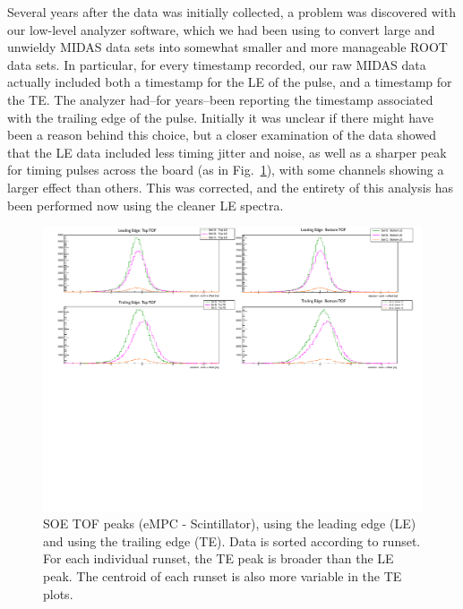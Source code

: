 Several years after the data was initially collected, a problem was discovered with our low-level analyzer software, which we had been using to convert large and unwieldy MIDAS data sets into somewhat smaller and more manageable ROOT data sets.  In particular, for every timestamp recorded, our raw MIDAS data actually included both a timestamp for the \ac{LE} of the pulse, and a timestamp for the \ac{TE}.  The analyzer had--for years--been reporting the timestamp associated with the trailing edge of the pulse.  Initially it was unclear if there might have been a reason behind this choice, but a closer examination of the data showed that the LE data included less timing jitter and noise, as well as a sharper peak for timing pulses across the board (as in Fig.~\ref{fig:LE_TE}), with some channels showing a larger effect than others.  This was corrected, and the entirety of this analysis has been performed now using the cleaner LE spectra.  


\begin{figure}[h!!t!]
	\centering
	\includegraphics[width=.999\linewidth]
	{Figures/LE_TE_peaks.pdf}
	\caption[LE and TE Timing Peaks]{SOE TOF peaks (eMPC - Scintillator), using the leading edge (LE) and using the trailing edge (TE).  Data is sorted according to runset.  For each individual runset, the TE peak is broader than the LE peak.  The centroid of each runset is also more variable in the TE plots.}	
	\label{fig:LE_TE}
\end{figure}


